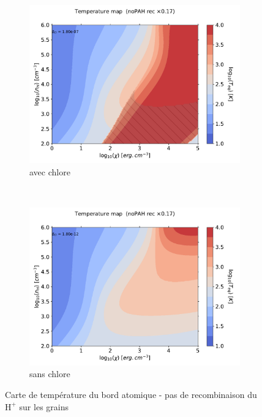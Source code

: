 \begin{figure}[htbp]
    \centering
    \begin{subfigure}[t]{0.45\textwidth} %
        \centering \includegraphics[trim = {0 0 0 1.5cm},clip,width=1\textwidth]{figure/Cl/model/mapG0nHTeq_m6p7_imp_noPAH_3p0PE_OI_CII_ggr_elecrec_lyman_OI.pdf}
        \caption{avec chlore}
    \end{subfigure}
    ~ 
    \begin{subfigure}[t]{0.45\textwidth}
        \centering \includegraphics[trim = {0 0 0 1.5cm},clip,width=1\textwidth]{figure/Cl/model/mapG0nHTeq_m11p7_imp_noPAH_3p0PE_OI_CII_ggr_elecrec_lyman_OI.pdf}
        \caption{sans chlore}
    \end{subfigure}
    \caption{Carte de température du bord atomique - pas de recombinaison du $\mathrm{H}^+$ sur les grains}
    \label{fig:Cl:model:mapT:3norec}
\end{figure}


